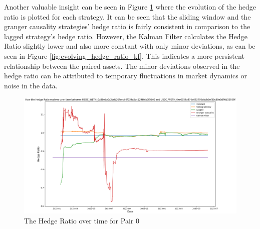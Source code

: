 \noindent Another valuable insight can be seen in Figure \ref{fig:HedgeRatioPerStrat} where the evolution of the hedge ratio is plotted for each strategy. It can be seen that the sliding window and the granger causality strategies' hedge ratio is fairly consistent in comparison to the lagged strategy's hedge ratio. However, the Kalman Filter calculates the Hedge Ratio slightly lower and also more constant with only minor deviations, as can be seen in Figure \ref{fig:evolving_hedge_ratio_kf}. This indicates a more persistent relationship between the paired assets. The minor deviations observed in the hedge ratio can be attributed to temporary fluctuations in market dynamics or noise in the data.

\begin{figure}[H]
    \centering
    \includegraphics[width=\linewidth]{evaluation/Images/HedgeRatioPerStrat.png}
    \caption{The Hedge Ratio over time for Pair 0}
    \label{fig:HedgeRatioPerStrat}
\end{figure}

